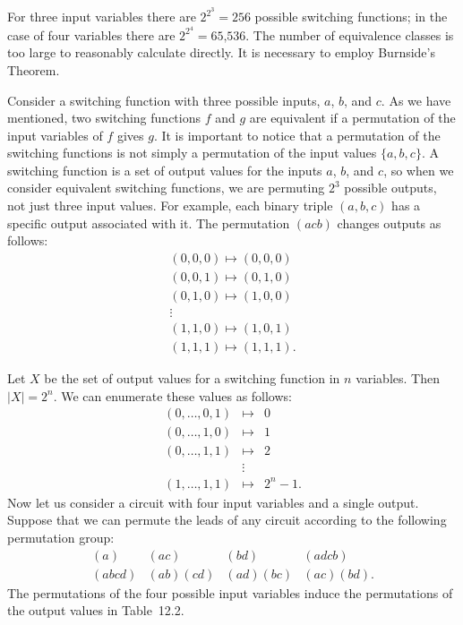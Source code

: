 \begin{example}
 
For three input variables there are $2^{2^3}=256$ possible switching
functions; in the case of four variables there are $2^{2^4} =
\mbox{65,536}$. The number of equivalence classes is too large to reasonably
calculate directly. It is necessary to employ  Burnside's Theorem.
 
 
Consider a  switching function with three possible inputs, $a$, $b$,
and $c$. As we have mentioned, two switching functions $f$ and $g$ are
equivalent if a permutation of the input variables of $f$ gives $g$.
It is important to notice that a permutation of the switching
functions is not simply a permutation of the input values $\{a, b,
c\}$. A switching function is a set of output values for the inputs
$a$, $b$, and $c$, so when we consider equivalent switching functions, we
are permuting $2^3$ possible outputs, not just three input values. For
example, each binary triple $(a, b, c)$ has a specific output
associated with it. The  permutation $(acb)$ changes outputs as follows: 
$$
\begin{array}{c}
(0, 0, 0) \mapsto (0, 0, 0) \\
(0, 0, 1) \mapsto (0, 1, 0) \\
(0, 1, 0) \mapsto (1, 0, 0) \\
\vdots \\
(1, 1, 0) \mapsto (1, 0, 1) \\
(1, 1, 1) \mapsto (1, 1, 1).
\end{array}
$$
 
 
Let $X$ be the set of output values for a switching function in $n$
variables. Then $|X|=2^n$. We can enumerate these values as follows: 
\begin{eqnarray*}
(0, \ldots, 0, 1) & \mapsto & 0 \\
(0, \ldots, 1, 0) & \mapsto & 1 \\
(0, \ldots, 1, 1) & \mapsto & 2 \\
& \vdots & \\
(1, \ldots, 1, 1) & \mapsto & 2^n-1.
\end{eqnarray*}
Now let us consider a circuit with four input variables and a single
output. Suppose that we can permute the leads  of any circuit
according to the following permutation group: 
$$
\begin{array}{cccc}
(a)    & (ac)     & (bd)     & (adcb) \\
(abcd) & (ab)(cd) & (ad)(bc) & (ac)(bd).
\end{array}
$$
The permutations of the four possible input variables induce the
permutations of the output values in Table~12.2. 
 

\end{example}
